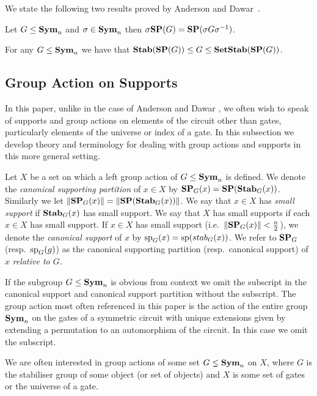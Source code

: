 \documentclass[../paper.tex]{subfiles}
\begin{document}
We state the following two results proved by Anderson and
Dawar~\cite{AndersonD17}.

\begin{lem}
  \label{lem:SP-conjugation}
  Let $G \leq \text{\textbf{Sym}}_n$ and $\sigma \in \text{\textbf{Sym}}_n$ then $\sigma \text{\textbf{SP}} (G) = \text{\textbf{SP}}(\sigma
  G \sigma^{-1})$.
\end{lem}

\begin{lem}
  For any $G \leq \text{\textbf{Sym}}_n$ we have that $\text{\textbf{Stab}} (\text{\textbf{SP}} (G)) \leq G \leq
  \text{\textbf{SetStab}}(\text{\textbf{SP}}(G))$.
\end{lem}

\subsection{Group Action on Supports}
\label{subsec:group-actions-on-supports}
In this paper, unlike in the case of Anderson and Dawar \cite{AndersonD17}, we
often wish to speak of supports and group actions on elements of the circuit
other than gates, particularly elements of the universe or index of a gate. In
this subsection we develop theory and terminology for dealing with group actions
and supports in this more general setting.

\begin{definition}
  Let $X$ be a set on which a left group action of $G \leq \text{\textbf{Sym}}_n$ is defined.
  We denote the \emph{canonical supporting partition} of $x \in X$ by $\text{\textbf{SP}}_G (x)
  = \text{\textbf{SP}} (\text{\textbf{Stab}}_G(x))$. Similarly we let $\| \text{\textbf{SP}}_G (x) \| = \| \text{\textbf{SP}} (\text{\textbf{Stab}}_G(x))
  \|$. We say that $x \in X$ has \emph{small support} if $\text{\textbf{Stab}}_G(x)$ has small
  support. We say that $X$ has small supports if each $x \in X$ has small
  support. If $x \in X$ has small support (i.e.\ $\| \text{\textbf{SP}}_G(x) \| < \frac{n}{2}$),
  we denote the \emph{canonical support} of $x$ by $\text{sp}_G(x) = \text{sp}
  (stab_G(x))$. We refer to $\text{\textbf{SP}}_G$ (resp.\ $\text{sp}_G(g)$) as the canonical
  supporting partition (resp.\ canonical support) of $x$ \emph{relative to $G$}.
\end{definition}

If the subgroup $G \leq \text{\textbf{Sym}}_n$ is obvious from context we omit the subscript in
the canonical support and canonical support partition without the subscript. The
group action most often referenced in this paper is the action of the entire
group $\text{\textbf{Sym}}_n$ on the gates of a symmetric circuit with unique extensions given
by extending a permutation to an automorphism of the circuit. In this case we
omit the subscript.

We are often interested in group actions of some set $G \lneq \text{\textbf{Sym}}_n$ on $X$,
where $G$ is the stabiliser group of some object (or set of objects) and $X$ is
some set of gates or the universe of a gate.
\end{document}
